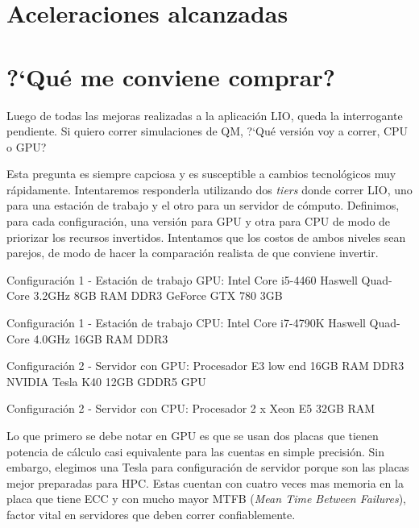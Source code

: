 \section{Aceleraciones alcanzadas}
%


\section{?`Qu\'e me conviene comprar?}
Luego de todas las mejoras realizadas a la aplicaci\'on LIO, queda la interrogante pendiente. Si quiero
correr simulaciones de QM, ?`Qu\'e versi\'on voy a correr, CPU o GPU?

Esta pregunta es siempre capciosa y es susceptible a cambios tecnol\'ogicos muy r\'apidamente. Intentaremos
responderla utilizando dos \textit{tiers} donde correr LIO, uno para una estaci\'on de trabajo
y el otro para un servidor de c\'omputo. Definimos, para cada configuraci\'on, una versi\'on para GPU y otra
para CPU de modo de priorizar los recursos invertidos. Intentamos que los costos de ambos niveles
sean parejos, de modo de hacer la comparaci\'on realista de que conviene invertir.

Configuraci\'on 1 - Estaci\'on de trabajo GPU:
Intel Core i5-4460 Haswell Quad-Core 3.2GHz
8GB RAM DDR3
GeForce GTX 780 3GB

Configuraci\'on 1 - Estaci\'on de trabajo CPU:
Intel Core i7-4790K Haswell Quad-Core 4.0GHz
16GB RAM DDR3

Configuraci\'on 2 - Servidor con GPU:
Procesador E3 low end
16GB RAM DDR3
NVIDIA Tesla K40 12GB GDDR5 GPU

Configuraci\'on 2 - Servidor con CPU:
Procesador 2 x Xeon E5
32GB RAM

Lo que primero se debe notar en GPU es que se usan dos placas que tienen potencia de c\'alculo casi equivalente
para las cuentas en simple precisi\'on. Sin embargo, elegimos una Tesla para configuraci\'on de servidor
porque son las placas mejor preparadas para HPC. Estas cuentan con cuatro veces mas memoria en la placa
que tiene ECC y con mucho mayor MTFB (\textit{Mean Time Between Failures}), factor vital en servidores
que deben correr confiablemente.

